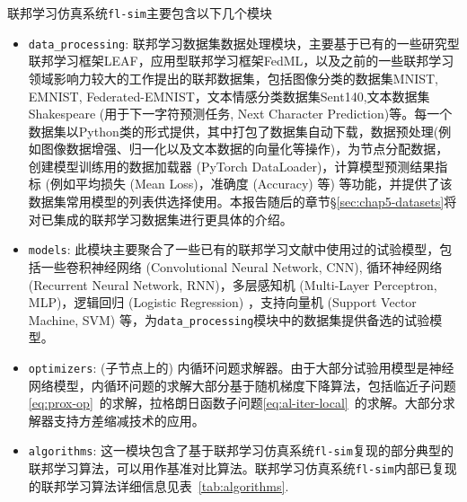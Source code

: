 联邦学习仿真系统\texttt{fl-sim}主要包含以下几个模块
\begin{itemize}
    \item \texttt{data\_processing}: 联邦学习数据集数据处理模块，主要基于已有的一些研究型联邦学习框架LEAF\cite{caldas2018_leaf}，应用型联邦学习框架FedML\cite{he_2020_fedml}，以及之前的一些联邦学习领域影响力较大的工作\cite{mcmahan2017fed_avg, sahu2018fedprox, reddi2020fed_opt}提出的联邦数据集，包括图像分类的数据集MNIST\cite{Lecun_1998_mnist}, EMNIST\cite{cohen2017emnist}, Federated-EMNIST\cite{caldas2018_leaf, sahu2018fedprox}，文本情感分类数据集Sent140\cite{sent140, caldas2018_leaf},文本数据集Shakespeare (用于下一字符预测任务, Next Character Prediction)\cite{mcmahan2017fed_avg, caldas2018_leaf}等。每一个数据集以Python类的形式提供，其中打包了数据集自动下载，数据预处理(例如图像数据增强、归一化以及文本数据的向量化等操作)，为节点分配数据，创建模型训练用的数据加载器 (PyTorch DataLoader)，计算模型预测结果指标 (例如平均损失 (Mean Loss)，准确度 (Accuracy) 等) 等功能，并提供了该数据集常用模型的列表供选择使用。本报告随后的章节\S\ref{sec:chap5-datasets}将对已集成的联邦学习数据集进行更具体的介绍。
    \item \texttt{models}: 此模块主要聚合了一些已有的联邦学习文献\cite{mcmahan2017fed_avg, zhang2020fedpd, sahu2018fedprox, Ghosh_2022_cfl, he_2020_fedml}中使用过的试验模型，包括一些卷积神经网络 (Convolutional Neural Network, CNN), 循环神经网络 (Recurrent Neural Network, RNN)，多层感知机 (Multi-Layer Perceptron, MLP)，逻辑回归 (Logistic Regression) ，支持向量机 (Support Vector Machine, SVM) 等，为\texttt{data\_processing}模块中的数据集提供备选的试验模型。
    \item \texttt{optimizers}: (子节点上的) 内循环问题求解器。由于大部分试验用模型是神经网络模型，内循环问题的求解大部分基于随机梯度下降算法，包括临近子问题\eqref{eq:prox-op}~的求解，拉格朗日函数子问题\eqref{eq:al-iter-local}~的求解。大部分求解器支持方差缩减技术的应用。
    \item \texttt{algorithms}: 这一模块包含了基于联邦学习仿真系统\texttt{fl-sim}复现的部分典型的联邦学习算法，可以用作基准对比算法。联邦学习仿真系统\texttt{fl-sim}内部已复现的联邦学习算法详细信息见表~\ref{tab:algorithms}.
\end{itemize}



